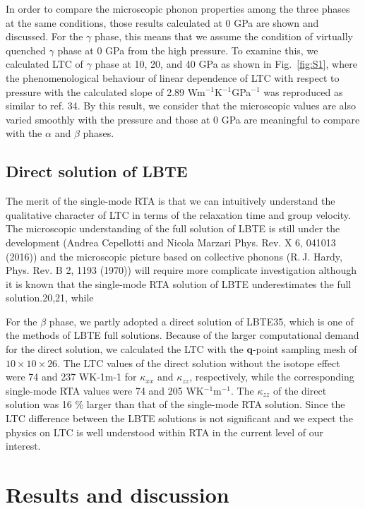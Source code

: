 \documentclass[twocolumn,amsmath,amssymb,a4paper,prb,superscriptaddress,floatfix]{revtex4-1}
\begin{document}
In order to compare the microscopic phonon properties among the three
phases at the same conditions, those results calculated at 0 GPa are
shown and discussed. For the $\gamma$ phase, this means that we assume
the condition of virtually quenched $\gamma$ phase at 0 GPa from the
high pressure. To examine this, we calculated LTC of $\gamma$ phase at
10, 20, and 40 GPa as shown in Fig.~\ref{fig:S1}, where the
phenomenological behaviour of linear dependence of LTC with respect to
pressure with the calculated slope of 2.89 Wm$^{-1}$K$^{-1}$GPa$^{-1}$
was reproduced as similar to ref. 34. By this result, we consider that
the microscopic values are also varied smoothly with the pressure and
those at 0 GPa are meaningful to compare with the $\alpha$ and $\beta$
phases.

\subsection{Direct solution of LBTE}
The merit of the single-mode RTA is that we can intuitively understand
the qualitative character of LTC in terms of the relaxation time and
group velocity. The microscopic understanding of the full solution of
LBTE is still under the development (Andrea Cepellotti and Nicola
Marzari Phys. Rev. X 6, 041013 (2016)) and the microscopic picture based
on collective phonons (R. J. Hardy, Phys. Rev. B 2, 1193 (1970)) will
require more complicate investigation although it is known that the
single-mode RTA solution of LBTE underestimates the full solution.20,21,
while

For the $\beta$ phase, we partly adopted a direct solution of LBTE35,
which is one of the methods of LBTE full solutions. Because of the
larger computational demand for the direct solution, we calculated the
LTC with the $\mathbf{q}$-point sampling mesh of $10\times 10\times
26$. The LTC values of the direct solution without the isotope effect
were 74 and 237 WK-1m-1 for $\kappa_{xx}$ and $\kappa_{zz}$,
respectively, while the corresponding single-mode RTA values were 74 and
205 WK$^{-1}$m$^{-1}$. The $\kappa_{zz}$ of the direct solution was 16
\% larger than that of the single-mode RTA solution. Since the LTC
difference between the LBTE solutions is not significant and we expect
the physics on LTC is well understood within RTA in the current level of
our interest.

\section{Results and discussion}
\end{document}

